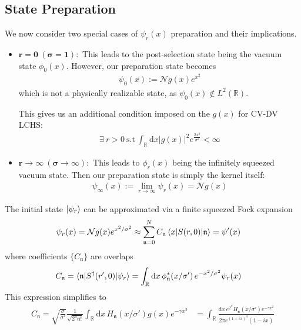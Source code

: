 \documentclass{article}
\newcommand{\dd}{\mathrm{d}}
\begin{document}
\subsection{State Preparation}


\label{ss:state-prep}




We now consider two special cases of $\psi_r(x)$ preparation and their implications.
\begin{itemize}
    \item $\mathbf{r=0~(\sigma=1):}$ This leads to the post-selection state being the vacuum state $\phi_0(x)$. However, our preparation state becomes
    \begin{align}
        \psi_0(x) := \mathcal{N}g(x)e^{x^2}
    \end{align}
    which is not a physically realizable state, as $\psi_0(x)\notin L^2(\mathbb{R}).$ 
    
    This gives us an additional condition imposed on the $g(x)$ for CV-DV LCHS: 
    \begin{align}
        \exists\ r>0\ \text{s.t}\ \int_\mathbb{R} \dd x |g(x)|^2 e^{\frac{2x^2}{\sigma^2}} <\infty
    \end{align}

    \item $\mathbf{r\to\infty~ (\sigma\to\infty):}$ This leads to $\phi_r(x)$ being the infinitely squeezed vacuum state. Then our preparation state is simply the kernel itself:
    \begin{align}
        \psi_\infty(x) := \lim_{r\to\infty} \psi_r(x)= \mathcal{N}g(x)
    \end{align}
\end{itemize}
The initial state $\ket{\psi_r}$ can be approximated via a finite squeezed Fock expansion
\begin{align}
    \psi_r(x)&=\mathcal{N}g(x)e^{x^2/\sigma^2} \approx \sum_{{\mathfrak n} = 0}^{N} C_{\mathfrak n} \braket{x|S(r,0)|{\mathfrak n}}=\psi'(x)
\end{align}
where coefficients $\{C_{\mathfrak n}\}$ are overlaps
\begin{align}
    C_{\mathfrak n} &= \braket{{\mathfrak n}|S^\dagger(r',0)|\psi_r} = \int_{\mathbb{R}} \dd x \, \phi^*_{\mathfrak n}(x/\sigma')\,e^{-x^2/\sigma^2} \psi_r(x)
\end{align}
This expression simplifies to
\begin{align}
    C_{\mathfrak n}= \sqrt{\frac{\sigma}{\sigma'}}\frac{1}{\sqrt{2^{\mathfrak n}{\mathfrak n}!}}\int_{\mathbb{R}}\dd x\,  H_{\mathfrak n}(x/\sigma')g(x)e^{-\gamma x^2}
    &= \int_{\mathbb{R}}\frac{\dd x\, e^{2^\beta}H_{\mathfrak n}(x/\sigma')e^{-\gamma x^2}}{2\pi e^{{(1+ix)}^\beta}(1-ix)}
    \label{eq:coefficients}
\end{align}
\end{document}
